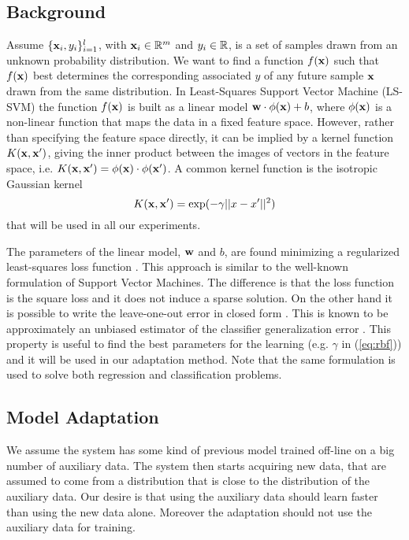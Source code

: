 \subsection{Background}

Assume $\{\mathbf{x}_i,y_i\}_{i=1}^l$, with $\mathbf{x}_i \in \mathbb{R}^m$ and $y_i \in \mathbb{R}$, is a
set of samples drawn from an unknown probability distribution. We want to find
a function $f(\mathbf{x})$ such that $f(\mathbf{x})$
best determines the corresponding associated $y$ of any future sample $\mathbf{x}$
drawn from the same distribution.
In Least-Squares Support Vector Machine
(LS-SVM) the function $f(\mathbf{x})$ is built as a linear model
$\mathbf{w} \cdot \phi(\mathbf{x}) + b$, where $\phi(\mathbf{x})$ is a non-linear function that maps
the data in a fixed feature space.
However, rather than specifying the feature space directly,
it can be implied by a kernel function $K(\mathbf{x},\mathbf{x}')$, giving the
inner product between the images of vectors in the feature
space, i.e. $K(\mathbf{x},\mathbf{x}')=\phi(\mathbf{x}) \cdot \phi(\mathbf{x}')$.
A common kernel function is the isotropic Gaussian kernel
\begin{equation}
	K(\xx,\xx')=\exp(-\gamma ||x-x'||^2)
	\label{eq:rbf}
\end{equation}
that will be used in all our experiments.

The parameters of the linear model, $\mathbf{w}$ and $b$, are found minimizing a
regularized least-squares loss function \cite{Cristianini00}.
This approach is similar to the well-known formulation of Support Vector
Machines. The difference is that the loss function is the square loss and it
does not induce a sparse solution. On the other hand it is possible to write
the leave-one-out error in closed form \cite{Rifkin07}. This is known to be
approximately an unbiased estimator of the classifier generalization error
\cite{LuntzB69}. This property is useful to find the best parameters for the
learning (e.g. $\gamma$ in (\ref{eq:rbf})) and it will be used in our
adaptation method. Note that the same formulation is used to solve both
regression and classification problems.

\subsection{Model Adaptation}

We assume the system has some kind of previous model trained off-line on a big
number of auxiliary data. The system then starts acquiring new data, that are
assumed to come from a distribution that is close to the distribution of the
auxiliary data. Our desire is that using the auxiliary data should learn faster
than using the new data alone. Moreover the adaptation should not use the
auxiliary data for training.

